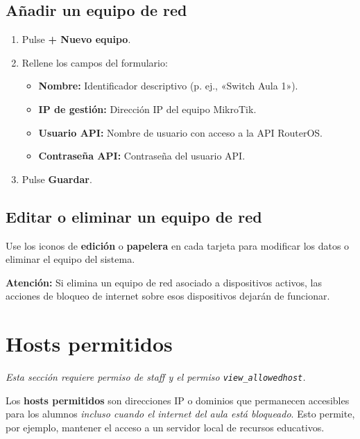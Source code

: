 \documentclass[12pt,a4paper]{article}
\begin{document}
\subsection{Añadir un equipo de red}

\begin{enumerate}
    \item Pulse \textbf{+ Nuevo equipo}.
    \item Rellene los campos del formulario:
    \begin{itemize}
        \item \textbf{Nombre:} Identificador descriptivo (p. ej., «Switch Aula 1»).
        \item \textbf{IP de gestión:} Dirección IP del equipo MikroTik.
        \item \textbf{Usuario API:} Nombre de usuario con acceso a la API RouterOS.
        \item \textbf{Contraseña API:} Contraseña del usuario API.
    \end{itemize}
    \item Pulse \textbf{Guardar}.
\end{enumerate}

\subsection{Editar o eliminar un equipo de red}

Use los iconos de \textbf{edición} o \textbf{papelera} en cada tarjeta para modificar los datos o eliminar el equipo del sistema.

\begin{warnnote}
\textbf{Atención:} Si elimina un equipo de red asociado a dispositivos activos, las acciones de bloqueo de internet sobre esos dispositivos dejarán de funcionar.
\end{warnnote}

\section{Hosts permitidos}

\textit{Esta sección requiere permiso de staff y el permiso \texttt{view\_allowedhost}.}

Los \textbf{hosts permitidos} son direcciones IP o dominios que permanecen accesibles para los alumnos \textit{incluso cuando el internet del aula está bloqueado}. Esto permite, por ejemplo, mantener el acceso a un servidor local de recursos educativos.
\end{document}
